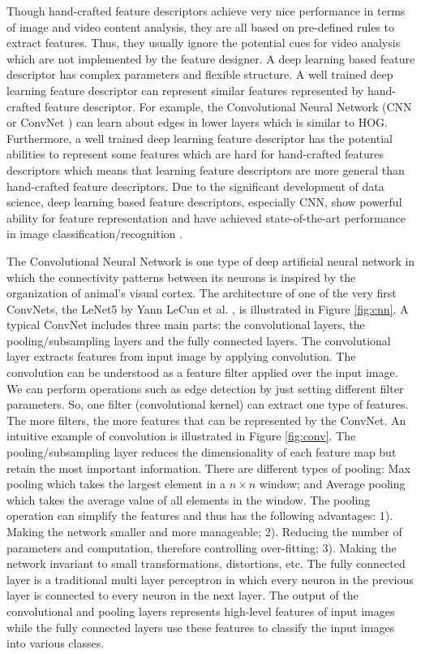 Though hand-crafted feature descriptors achieve very nice performance in terms of image and video content analysis, they are all based on pre-defined rules to extract features. Thus, they usually ignore the potential cues for video analysis which are not implemented by the feature designer. A deep learning based feature descriptor has complex parameters and flexible structure. A well trained deep learning feature descriptor can represent similar features represented by hand-crafted feature descriptor. For example, the Convolutional Neural Network (CNN or ConvNet \cite{cnn}) can learn about edges in lower layers which is similar to HOG. Furthermore, a well trained deep learning feature descriptor has the potential abilities to represent some features which are hard for hand-crafted features descriptors which means that  learning feature descriptors are more general than hand-crafted feature descriptors.  Due to the significant development of data science, deep learning based feature descriptors, especially CNN,  show powerful ability for feature representation and have achieved state-of-the-art performance in image classification/recognition \cite{kaiming}.
\par 
The Convolutional Neural Network is one type of deep artificial neural network in which the connectivity patterns between its neurons is inspired by the organization of animal's visual cortex. The architecture of one of the very first ConvNets, the LeNet5 by Yann LeCun et al. \cite{cnn}, is illustrated in Figure \ref{fig:cnn}. A typical ConvNet includes three main parts: the convolutional layers, the pooling/subsampling layers and the fully connected layers. The convolutional layer extracts features from input image by applying convolution. The convolution can be understood as a feature filter applied over the input image. We can perform operations such as edge detection by just setting different filter parameters. So, one filter (convolutional kernel) can extract one type of features. The more filters, the more features that can be represented by the ConvNet. An intuitive example of convolution is illustrated in Figure \ref{fig:conv}. The pooling/subsampling layer reduces the dimensionality of each feature map but retain the most important information. There are different types of pooling: Max pooling which takes the largest element in a \(n \times n\) window; and Average pooling which takes the average value of all elements in the window. The pooling operation can simplify the features and thus has the following advantages: 1). Making the network smaller and more manageable; 2). Reducing the number of parameters and computation, therefore controlling over-fitting; 3). Making the network invariant to small transformations, distortions, etc. The fully connected layer is a traditional multi layer perceptron in which every neuron in the previous layer is connected to every neuron in the next layer. The output of the convolutional and pooling layers represents high-level features of input images while the fully connected layers use these features to classify the input images into various classes.  

